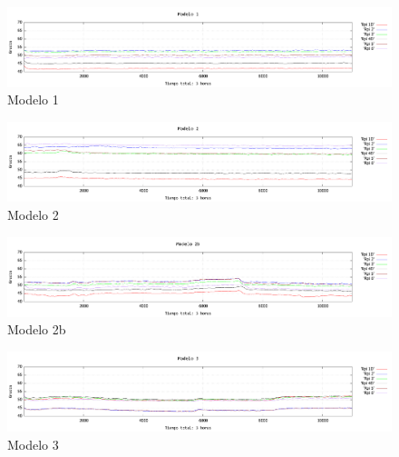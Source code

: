 \paragraph{}

\begin{figure}[H]
	\centering
  	\includegraphics[width=160mm]{Test/pr3_modelo1.pdf}
   	\caption[Prueba 3, Modelo 1]{Modelo 1}
   \label{figure5.9}
\end{figure}


\begin{figure}[H]
	\centering
  	\includegraphics[width=160mm]{Test/pr3_modelo2.pdf}
   	\caption[Prueba 3, Modelo 2]{Modelo 2}
   \label{figure5.10}
\end{figure}

\begin{figure}[H]
	\centering
  	\includegraphics[width=160mm]{Test/pr3_modelo2b.pdf}
   	\caption[Prueba 3, Modelo 2b]{Modelo 2b}
   \label{figure5.11}
\end{figure}

\begin{figure}[H]
	\centering
  	\includegraphics[width=160mm]{Test/pr3_modelo3.pdf}
   	\caption[Prueba 3, Modelo 3]{Modelo 3}
   \label{figure5.12}
\end{figure}

